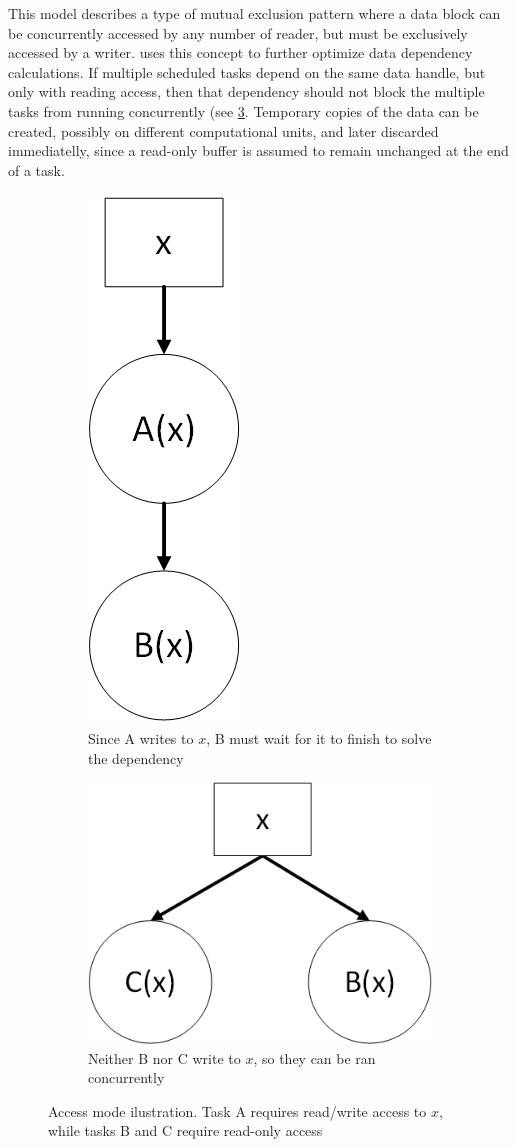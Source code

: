 \documentclass[main.tex]{subfiles}
\begin{document}
This model describes a type of mutual exclusion pattern where a data block can be concurrently accessed by any number of reader, but must be exclusively accessed by a writer. \starpu uses this concept to further optimize data dependency calculations. If multiple scheduled tasks depend on the same data handle, but only with reading access, then that dependency should not block the multiple tasks from running concurrently (see \cref{fig:starpu_dep}. Temporary copies of the data can be created, possibly on different computational units, and later discarded immediatelly, since a read-only buffer is assumed to remain unchanged at the end of a task.

\begin{figure}[!htp]
  \centering
  \begin{subfigure}{.5\textwidth}
    \centering
    \includegraphics[width=0.2\linewidth]{visio/starpu_dep_rw}
    \caption{Since A writes to $x$, B must wait for it to finish to solve the dependency \label{fig:starpu_dep_rw}}
  \end{subfigure}%
  \begin{subfigure}{.5\textwidth}
    \centering
    \includegraphics[width=0.6\linewidth]{visio/starpu_dep_r}
    \caption{Neither B nor C write to $x$, so they can be ran concurrently \label{fig:starpu_dep_r}}
  \end{subfigure}
  \caption{Access mode ilustration. Task A requires read/write access to $x$, while tasks B and C require read-only access \label{fig:starpu_dep}}
\end{figure}
\end{document}
